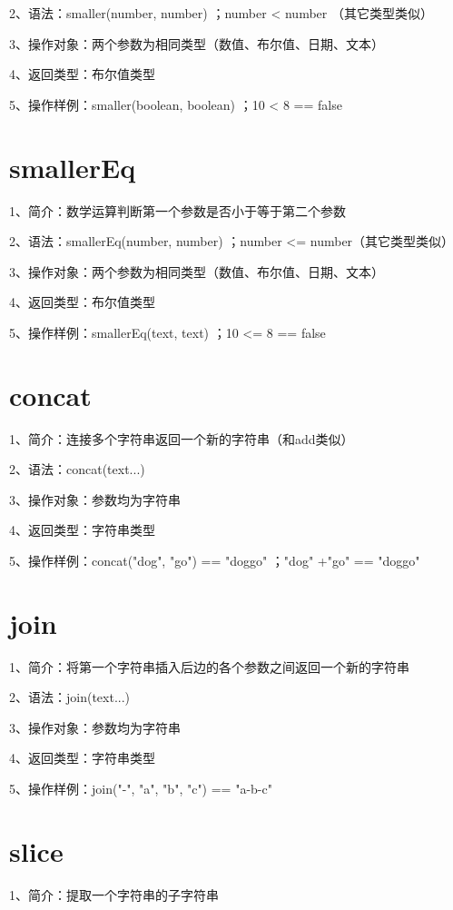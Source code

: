 2、语法：smaller(number, number) ；number < number （其它类型类似）

3、操作对象：两个参数为相同类型（数值、布尔值、日期、文本）

4、返回类型：布尔值类型

5、操作样例：smaller(boolean, boolean) ；10 < 8 == false

\section{smallerEq}

1、简介：数学运算判断第一个参数是否小于等于第二个参数

2、语法：smallerEq(number, number) ；number <= number（其它类型类似）

3、操作对象：两个参数为相同类型（数值、布尔值、日期、文本）

4、返回类型：布尔值类型

5、操作样例：smallerEq(text, text) ；10 <= 8 == false

\section{concat}

1、简介：连接多个字符串返回一个新的字符串（和add类似）

2、语法：concat(text...)

3、操作对象：参数均为字符串

4、返回类型：字符串类型

5、操作样例：concat("dog", "go") == "doggo" ；"dog" +"go" == "doggo"

\section{join}

1、简介：将第一个字符串插入后边的各个参数之间返回一个新的字符串

2、语法：join(text...)

3、操作对象：参数均为字符串

4、返回类型：字符串类型

5、操作样例：join("-", "a", "b", "c") == "a-b-c"

\section{slice}

1、简介：提取一个字符串的子字符串

